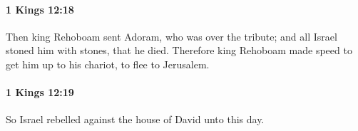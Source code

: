 		\paragraph{1 Kings 12:18} %
			\label{1KINGS-12-18}

			Then king Rehoboam sent Adoram, who was over the tribute; and all Israel stoned him with stones, that he died. Therefore king Rehoboam made speed to get him up to his chariot, to flee to Jerusalem.


		\paragraph{1 Kings 12:19} %
			\label{1KINGS-12-19}

			So Israel rebelled against the house of David unto this day.


